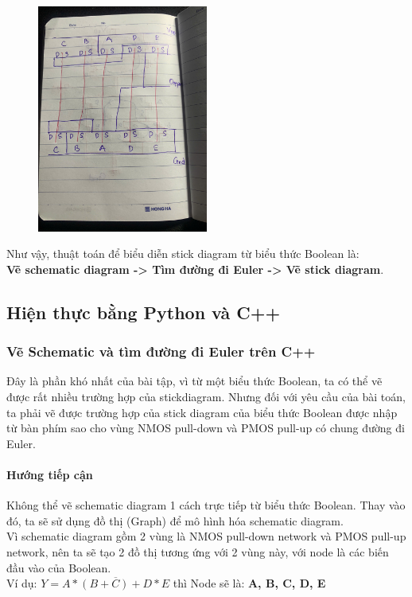 \documentclass[a4paper,12pt]{article}
\begin{document}
\begin{figure}[H]
    \centering
    \includegraphics[width=0.5\textwidth]{../PNG/Stick_handwrite.jpg}
    \label{fig:Ex_Schematic}\\
\end{figure}

Như vậy, thuật toán để biểu diễn stick diagram từ biểu thức Boolean là:\\
\textbf{Vẽ schematic diagram -> Tìm đường đi Euler -> Vẽ stick diagram}.
\newpage
\subsection{Hiện thực bằng Python và C++}
\subsubsection{Vẽ Schematic và tìm đường đi Euler trên C++}
Đây là phần khó nhất của bài tập, vì từ một biểu thức Boolean, ta có thể vẽ được rất nhiều trường hợp của stickdiagram.
Nhưng đối với yêu cầu của bài toán, ta phải vẽ được trường hợp của stick diagram của biểu thức Boolean được nhập từ bàn phím
sao cho vùng NMOS pull-down và PMOS pull-up có chung đường đi Euler.
\paragraph{Hướng tiếp cận}
Không thể vẽ schematic diagram 1 cách trực tiếp từ biểu thức Boolean.
Thay vào đó, ta sẽ sử dụng đồ thị (Graph) để mô hình hóa schematic diagram.\\
Vì schematic diagram gồm 2 vùng là NMOS pull-down network và PMOS pull-up network, nên ta sẽ tạo 2 đồ thị tương ứng với 2 vùng này, 
với node là các biến đầu vào của Boolean.\\
Ví dụ: \( Y = \overline{A *(B + C) + D * E} \) thì Node sẽ là:
\textbf{A, B, C, D, E}\\
\end{document}
